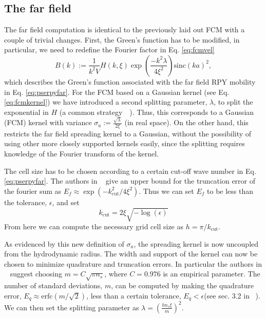 \documentclass[ twoside,openright,titlepage,numbers=noenddot,%
headinclude,footinclude,cleardoublepage=empty,abstract=on,
BCOR=5mm,paper=b5,fontsize=11pt, dvipsnames
]{scrreprt}
\newcommand{\sinc}{\textrm{sinc}}
\begin{document}
\subsection*{The far field}

The far field computation is identical to the previously laid out \gls{FCM} with a couple of trivial changes.
First, the Green's function has to be modified, in particular, we need to redefine the Fourier factor in Eq. \eqref{eq:fcmvel}
\begin{equation}
  B(k) := \frac{1}{k^2V}H(k,\xi)\exp\left(\frac{-k^2\lambda}{4\xi^2}\right)\sinc(ka)^2,
\end{equation}
which describes the Green's function associated with the far field \gls{RPY} mobility in Eq. \eqref{eq:pserpyfar}. For the \gls{FCM} based on a Gaussian kernel (see Eq. \eqref{eq:fcmkernel}) we have introduced a second splitting parameter, $\lambda$, to split the exponential in $H$ (a common strategy~\cite{Lindbo2011}~\cite{Wang2016}). Thus, this corresponds to a Gaussian (\gls{FCM}) kernel with variance $\sigma_a := \frac{\sqrt{\lambda}}{2\xi}$ (in real space). On the other hand, this restricts the far field spreading kernel to a Gaussian, without the possibility of using other more closely supported kernels easily, since the splitting requires knowledge of the Fourier transform of the kernel.

The cell size has to be chosen according to a certain cut-off wave number in Eq. \eqref{eq:pserpyfar}. The authors in ~\cite{Lindbo2010} give an upper bound for the truncation error of the fourier sum as $E_f \approx \exp(-k_{\textrm{cut}}^2/4\xi^2)$. Thus we can set $E_f$ to be less than the tolerance, $\epsilon$, and set
\begin{equation}
  k_{\textrm{cut}} = 2\xi\sqrt{-\log(\epsilon)}
\end{equation}
From here we can compute the necessary grid cell size as $h = \pi/k_{\textrm{cut}}$.

As evidenced by this new definition of $\sigma_a$, the spreading kernel is now uncoupled from the hydrodynamic radius. The width and support of the kernel can now be chosen to minimize quadrature and truncation errors. In particular the authors in ~\cite{Lindbo2011} suggest choosing $m = C\sqrt{\pi n_s}$, where $C = 0.976$ is an empirical parameter. The number of standard deviations, $m$, can be computed by making the quadrature error, $E_q \approx \textrm{erfc}(m/\sqrt{2})$, less than a certain tolerance, $E_q<\epsilon$(see sec. 3.2 in ~\cite{Lindbo2011}). We can then set the splitting parameter as $\lambda = \left(\frac{hn_s\xi}{m}\right)^2$.
\end{document}
